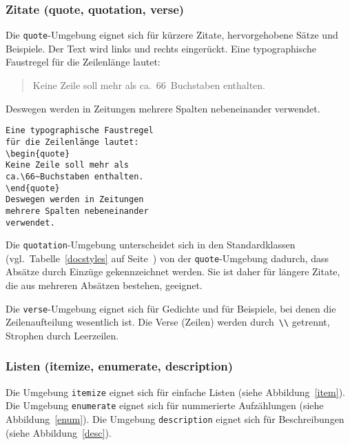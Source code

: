 \subsubsection{Zitate (quote, quotation, verse)}
 
Die \texttt{quote}-Umgebung eignet sich für kürzere Zitate,
hervorgehobene Sätze und Beispiele.
Der Text wird links und rechts eingerückt.
\exa
Eine typographische Faustregel
für die Zeilenlänge lautet:
\begin{quote}

Keine Zeile soll mehr als
ca.\ 66~Buchstaben enthalten.
\end{quote}
Deswegen werden in Zeitungen
mehrere Spalten nebeneinander
verwendet.
\exb 
\begin{verbatim}
Eine typographische Faustregel
für die Zeilenlänge lautet:
\begin{quote}
Keine Zeile soll mehr als
ca.\66~Buchstaben enthalten.
\end{quote}
Deswegen werden in Zeitungen
mehrere Spalten nebeneinander
verwendet.
\end{verbatim}
\exc

Die \texttt{quotation}-Umgebung unterscheidet sich in den
Standardklassen (vgl.\ Tabelle~\ref{docstyles} auf
Seite~\pageref{docstyles}) von der \texttt{quote}-Umgebung
dadurch, dass Absätze durch Einzüge gekennzeichnet werden.
Sie ist daher für längere Zitate, die aus mehreren Absätzen
bestehen, geeignet.

Die \texttt{verse}-Umgebung eignet sich für Gedichte und für
Beispiele, bei denen die Zeilenaufteilung wesentlich ist.  Die
Verse (Zeilen) werden durch~\lstinline|\\| getrennt, Strophen durch
Leerzeilen.


\subsubsection{Listen (itemize, enumerate, description)}
Die Umgebung \texttt{itemize} eignet sich für einfache Listen
(siehe Abbildung~\ref{item}).
Die Umgebung \texttt{enumerate} eignet sich für nummerierte
Aufzählungen (siehe Abbildung~\ref{enum}).
Die Umgebung \texttt{description} eignet sich für Beschreibungen
(siehe Abbildung~\ref{desc}).

